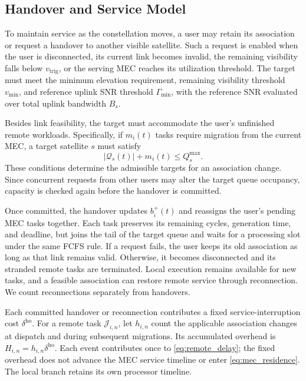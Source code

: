\documentclass[journal]{IEEEtran}
\begin{document}
\subsection{Handover and Service Model}
\label{subsec:handover_model}

To maintain service as the constellation moves, a user
may retain its association or request a handover to
another visible satellite. Such a request is enabled
when the user is disconnected, its current link becomes
invalid, the remaining visibility falls below
$v_{\mathrm{trig}}$, or the serving MEC reaches its
utilization threshold. The target must meet the minimum
elevation requirement, remaining visibility threshold
$v_{\min}$, and reference uplink SNR threshold
$\Gamma_{\min}$, with the reference SNR evaluated
over total uplink bandwidth $B_s$.

Besides link feasibility, the target must accommodate
the user's unfinished remote workloads. Specifically,
if $m_i(t)$ tasks require migration from the current
MEC, a target satellite $s$ must satisfy
\begin{equation}
|\mathcal{Q}_s(t)|+m_i(t)\leq Q_s^{\max}.
\label{eq:migration_capacity}
\end{equation}
These conditions determine the admissible targets
for an association change.
Since concurrent requests from other users may alter
the target queue occupancy, capacity is checked again
before the handover is committed.

Once committed, the handover updates $b_i^{+}(t)$
and reassigns the user's pending MEC tasks together.
Each task preserves its remaining cycles, generation
time, and deadline, but joins the tail of the target
queue and waits for a processing slot under the same
FCFS rule. If a request fails, the user keeps its old
association as long as that link remains valid.
Otherwise, it becomes disconnected and its stranded
remote tasks are terminated. Local execution remains
available for new tasks, and a feasible association
can restore remote service through reconnection.
We count reconnections separately from handovers.

Each committed handover or reconnection contributes
a fixed service-interruption cost $\delta^{\mathrm{ho}}$.
For a remote task $\mathcal{J}_{i,n}$, let $h_{i,n}$
count the applicable association changes at dispatch
and during subsequent migrations. Its accumulated
overhead is $H_{i,n}=h_{i,n}\delta^{\mathrm{ho}}$.
Each event contributes once to \eqref{eq:remote_delay};
the fixed overhead does not advance the MEC service
timeline or enter \eqref{eq:mec_residence}.
The local branch retains its own processor timeline.
\end{document}
